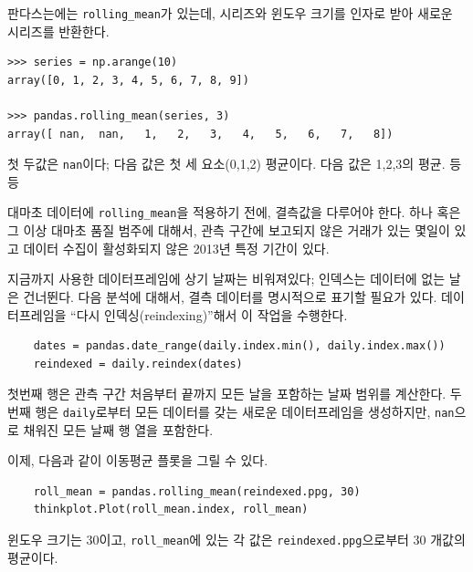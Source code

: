 
판다스는에는 \verb"rolling_mean"가 있는데, 시리즈와 윈도우 크기를 인자로 받아 새로운 시리즈를 반환한다.

\begin{verbatim}
>>> series = np.arange(10)
array([0, 1, 2, 3, 4, 5, 6, 7, 8, 9])

>>> pandas.rolling_mean(series, 3)
array([ nan,  nan,   1,   2,   3,   4,   5,   6,   7,   8])
\end{verbatim}

첫 두값은 {\tt nan}이다; 다음 값은 첫 세 요소(0,1,2) 평균이다.
다음 값은 1,2,3의 평균. 등등

대마초 데이터에 \verb"rolling_mean"을 적용하기 전에, 결측값을 다루어야 한다. 하나 혹은 그 이상 대마초 품질 범주에 대해서, 관측 구간에 보고되지 않은 거래가 있는 몇일이 있고 데이터 수집이 활성화되지 않은 2013년 특정 기간이 있다.


지금까지 사용한 데이터프레임에 상기 날짜는 비워져있다; 인덱스는 데이터에 없는 날은 건너뛴다. 다음 분석에 대해서, 결측 데이터를 명시적으로 표기할 필요가 있다. 데이터프레임을 ``다시 인덱싱(reindexing)''해서 이 작업을 수행한다.

\begin{verbatim}
    dates = pandas.date_range(daily.index.min(), daily.index.max())
    reindexed = daily.reindex(dates)
\end{verbatim}

첫번째 행은 관측 구간 처음부터 끝까지 모든 날을 포함하는 날짜 범위를 계산한다. 두번째 행은 {\tt daily}로부터 모든 데이터를 갖는 새로운 데이터프레임을 생성하지만, {\tt nan}으로 채워진 모든 날째 행 열을 포함한다.


이제, 다음과 같이 이동평균 플롯을 그릴 수 있다.

\begin{verbatim}
    roll_mean = pandas.rolling_mean(reindexed.ppg, 30)
    thinkplot.Plot(roll_mean.index, roll_mean)
\end{verbatim}

윈도우 크기는 30이고, \verb"roll_mean"에 있는 각 값은 {\tt reindexed.ppg}으로부터 30 개값의 평균이다.


